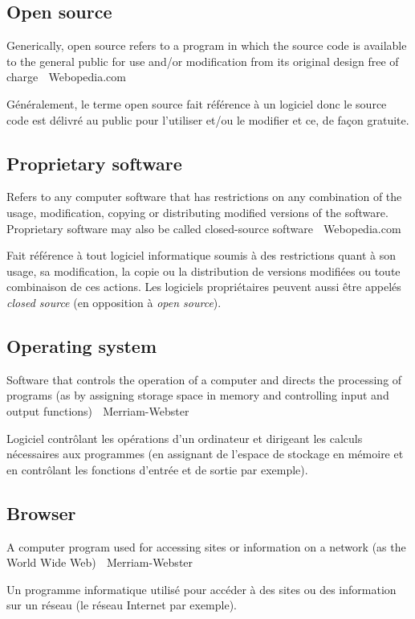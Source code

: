 \documentclass[12pt]{article}
\begin{document}
\subsection*{Open source}

{\color{bg}Generically, open source refers to a program in which the
  source code is available to the general public for use and/or
  modification from its original design free of charge \textemdash
  $\;$ Webopedia.com }

Généralement, le terme open source fait référence à un logiciel donc
le source code est délivré au public pour l'utiliser et/ou le modifier
et ce, de façon gratuite.

\subsection*{Proprietary software}

{\color{bg}Refers to any computer software that has restrictions on
  any combination of the usage, modification, copying or distributing
  modified versions of the software. Proprietary software may also be
  called closed-source software \textemdash $\;$ Webopedia.com }

Fait référence à tout logiciel informatique soumis à des restrictions
quant à son usage, sa modification, la copie ou la distribution de
versions modifiées ou toute combinaison de ces actions. Les logiciels
propriétaires peuvent aussi être appelés \textit{closed source} (en
opposition à \textit{open source}).

\subsection*{Operating system}

{\color{bg}Software that controls the operation of a computer and
  directs the processing of programs (as by assigning storage space in
  memory and controlling input and output functions) \textemdash $\;$
  Merriam-Webster }

Logiciel contrôlant les opérations d'un ordinateur et dirigeant les
calculs nécessaires aux programmes (en assignant de l'espace de
stockage en mémoire et en contrôlant les fonctions d'entrée et de
sortie par exemple).

\subsection*{Browser}

{\color{bg}A computer program used for accessing sites or information
  on a network (as the World Wide Web) \textemdash $\;$
  Merriam-Webster }

Un programme informatique utilisé pour accéder à des sites ou des
information sur un réseau (le réseau Internet par exemple).



\end{document}
